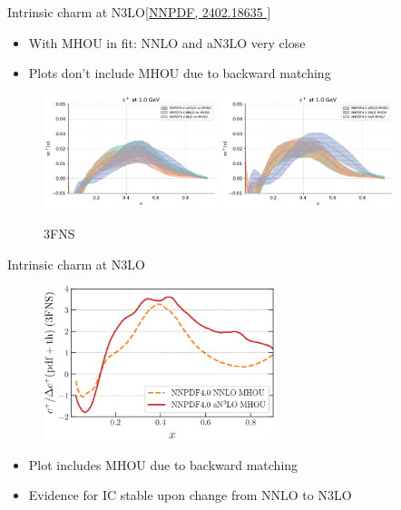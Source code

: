 \documentclass[aspectratio=43, 8pt,t]{beamer}
\begin{document}
\begin{frame}{Intrinsic charm at N3LO}{\color{gray}\footnotesize [\hyperlink{https://arxiv.org/abs/2402.18635 }{NNPDF, 2402.18635 }]}
  \begin{itemize}
    \item With MHOU in fit: NNLO and aN3LO very close
    \item Plots don't include MHOU due to backward matching
  \end{itemize}

  \begin{figure}
    \includegraphics[width=0.45\textwidth]{n3lo_charm.pdf}
    \includegraphics[width=0.45\textwidth]{n3lo_charm_mhou.pdf}
    \caption*{3FNS}
  \end{figure}
\end{frame}

\begin{frame}{Intrinsic charm at N3LO}
  \begin{figure}
    \includegraphics[width=0.6\textwidth]{IC-Significance-N3LO.pdf}
  \end{figure}
  \begin{itemize}
    \item Plot includes MHOU due to backward matching
    \item Evidence for IC stable upon change from NNLO to N3LO
  \end{itemize}
\end{frame}
\end{document}
